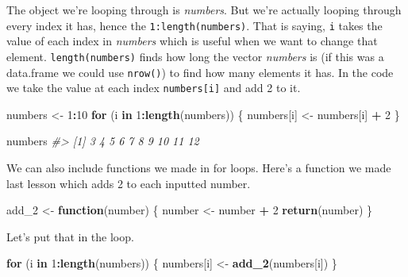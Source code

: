 \documentclass[
  12pt,
]{book}
\newenvironment{Shaded}{\begin{snugshade}}{\end{snugshade}}
\newcommand{\CommentTok}[1]{\textcolor[rgb]{0.37,0.37,0.37}{\textit{#1}}}
\newcommand{\ControlFlowTok}[1]{\textcolor[rgb]{0.27,0.27,0.27}{\textbf{#1}}}
\newcommand{\DecValTok}[1]{\textcolor[rgb]{0.06,0.06,0.06}{#1}}
\newcommand{\KeywordTok}[1]{\textcolor[rgb]{0.27,0.27,0.27}{\textbf{#1}}}
\newcommand{\NormalTok}[1]{#1}
\newcommand{\OperatorTok}[1]{\textcolor[rgb]{0.43,0.43,0.43}{\textbf{#1}}}
\newcommand{\StringTok}[1]{\textcolor[rgb]{0.5,0.5,0.5}{#1}}
\begin{document}
The object we're looping through is \emph{numbers}. But we're actually looping through every index it has, hence the \texttt{1:length(numbers)}. That is saying, \texttt{i} takes the value of each index in \emph{numbers} which is useful when we want to change that element. \texttt{length(numbers)} finds how long the vector \emph{numbers} is (if this was a data.frame we could use \texttt{nrow()}) to find how many elements it has. In the code we take the value at each index \texttt{numbers{[}i{]}} and add 2 to it.

\begin{Shaded}
\begin{Highlighting}[]
\NormalTok{numbers <{-}}\StringTok{ }\DecValTok{1}\OperatorTok{:}\DecValTok{10}
\ControlFlowTok{for}\NormalTok{ (i }\ControlFlowTok{in} \DecValTok{1}\OperatorTok{:}\KeywordTok{length}\NormalTok{(numbers)) \{}
\NormalTok{  numbers[i] <{-}}\StringTok{ }\NormalTok{numbers[i] }\OperatorTok{+}\StringTok{ }\DecValTok{2}
\NormalTok{\}}
\end{Highlighting}
\end{Shaded}

\begin{Shaded}
\begin{Highlighting}[]
\NormalTok{numbers}
\CommentTok{\#>  [1]  3  4  5  6  7  8  9 10 11 12}
\end{Highlighting}
\end{Shaded}

We can also include functions we made in for loops. Here's a function we made last lesson which adds 2 to each inputted number.

\begin{Shaded}
\begin{Highlighting}[]
\NormalTok{add\_}\DecValTok{2}\NormalTok{ <{-}}\StringTok{ }\ControlFlowTok{function}\NormalTok{(number) \{}
\NormalTok{  number <{-}}\StringTok{ }\NormalTok{number }\OperatorTok{+}\StringTok{ }\DecValTok{2}
  \KeywordTok{return}\NormalTok{(number)}
\NormalTok{\}}
\end{Highlighting}
\end{Shaded}

Let's put that in the loop.

\begin{Shaded}
\begin{Highlighting}[]
\ControlFlowTok{for}\NormalTok{ (i }\ControlFlowTok{in} \DecValTok{1}\OperatorTok{:}\KeywordTok{length}\NormalTok{(numbers)) \{}
\NormalTok{  numbers[i] <{-}}\StringTok{ }\KeywordTok{add\_2}\NormalTok{(numbers[i])}
\NormalTok{\}}
\end{Highlighting}
\end{Shaded}
\end{document}
